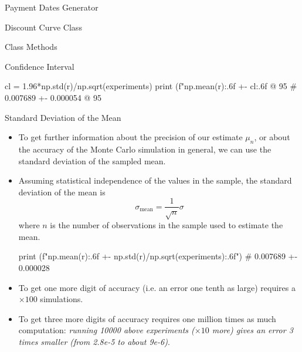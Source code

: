 \documentclass{beamer}
\begin{document}
\begin{frame}[fragile]{Payment Dates Generator}
\begin{itemize}
\begin{frame}{Discount Curve Class}
\begin{frame}{Class Methods}
\begin{itemize}
\begin{iptyhon}
\begin{frame}[fragile]{Confidence Interval}
\begin{ipython}
cl = 1.96*np.std(r)/np.sqrt(experiments)
print (f"{np.mean(r):.6f} +- {cl:.6f} @ 95%
# 0.007689 +- 0.000054 @ 95%
\end{ipython}
\end{frame}

\begin{frame}[fragile]{Standard Deviation of the Mean}
\begin{itemize}
\item To get further information about the precision of our estimate $\mu_n$, or about the accuracy of the Monte Carlo simulation in general, we can use the standard deviation of the sampled mean. 
\item Assuming statistical independence of the values in the sample, the standard deviation of the mean is 
\begin{equation*}
\sigma _{\text{mean}}={\frac {1}{\sqrt {n}}}\sigma
\end{equation*}
where $n$ is the number of observations in the sample used to estimate the mean. 

\begin{ipython}
print (f"{np.mean(r):.6f} +- {np.std(r)/np.sqrt(experiments):.6f}")
# 0.007689 +- 0.000028
\end{ipython}
\item To get one more digit of accuracy (i.e. an error one tenth as large) requires a $\times100$ simulations.
\item To get three more digits of accuracy requires one million times as much computation: \emph{running 10000 above experiments ($\times10$ more) gives an error 3 times smaller (from 2.8e-5 to about 9e-6)}.
\end{itemize}
\end{frame}


\end{iptyhon}
\end{itemize}
\end{frame}
\end{frame}
\end{itemize}
\end{frame}
\end{document}
